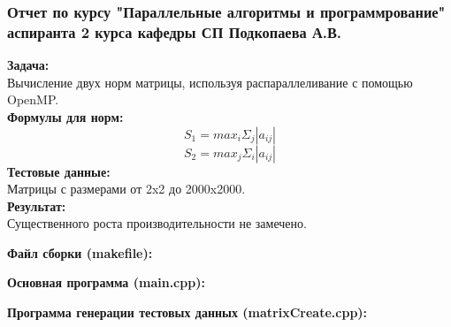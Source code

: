 \documentclass[12pt]{article}
\begin{document}
\subsubsection*{Отчет по курсу "Параллельные алгоритмы и программрование"
аспиранта 2 курса кафедры СП Подкопаева А.В.}
\textbf{Задача:}\\
Вычисление двух норм матрицы, используя распараллеливание с помощью OpenMP.\\
\textbf{Формулы для норм:}\\
$$
S_{1} = max_{i}\Sigma_{j}|a_{ij}|
$$
$$
S_{2} = max_{j}\Sigma_{i}|a_{ij}|
$$
\textbf{Тестовые данные:}\\
Матрицы с размерами от 2x2 до 2000x2000.\\
\textbf{Результат:}\\
Существенного роста производительности не замечено.

\textbf{Файл сборки (makefile):}
{\small

}

\textbf{Основная программа (main.cpp):}

{\small

}

\textbf{Программа генерации тестовых данных (matrixCreate.cpp):}
{\small

}
\end{document}
